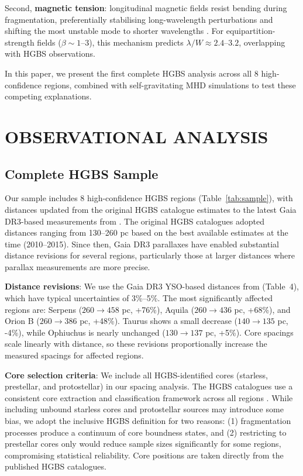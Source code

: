 \documentclass[twocolumn,longtitle,usenatbib]{mnras}
\begin{document}
Second, \textbf{magnetic tension}: longitudinal magnetic fields resist bending during fragmentation, preferentially stabilising long-wavelength perturbations and shifting the most unstable mode to shorter wavelengths \citep{Nakamura1993}. For equipartition-strength fields ($\beta \sim 1$--$3$), this mechanism predicts $\lambda/W \approx 2.4$--$3.2$, overlapping with HGBS observations.

In this paper, we present the first complete HGBS analysis across all 8 high-confidence regions, combined with self-gravitating MHD simulations to test these competing explanations.

\section{OBSERVATIONAL ANALYSIS}

\subsection{Complete HGBS Sample}

Our sample includes 8 high-confidence HGBS regions (Table~\ref{tab:sample}), with distances updated from the original HGBS catalogue estimates to the latest Gaia DR3-based measurements from \citet{Zhang2023}. The original HGBS catalogues \citep{Konyves2015, Konyves2020, Andre2016, Ladjelate2020} adopted distances ranging from 130--260 pc based on the best available estimates at the time (2010--2015). Since then, Gaia DR3 parallaxes have enabled substantial distance revisions for several regions, particularly those at larger distances where parallax measurements are more precise.

\textbf{Distance revisions}: We use the Gaia DR3 YSO-based distances from \citet{Zhang2023} (Table~4), which have typical uncertainties of 3\%--5\%. The most significantly affected regions are: Serpens ($260 \to 458$ pc, +76\%), Aquila ($260 \to 436$ pc, +68\%), and Orion B ($260 \to 386$ pc, +48\%). Taurus shows a small decrease ($140 \to 135$ pc, -4\%), while Ophiuchus is nearly unchanged ($130 \to 137$ pc, +5\%). Core spacings scale linearly with distance, so these revisions proportionally increase the measured spacings for affected regions.

\textbf{Core selection criteria}: We include all HGBS-identified cores (starless, prestellar, and protostellar) in our spacing analysis. The HGBS catalogues use a consistent core extraction and classification framework across all regions \citep{Konyves2015, Konyves2020}. While including unbound starless cores and protostellar sources may introduce some bias, we adopt the inclusive HGBS definition for two reasons: (1) fragmentation processes produce a continuum of core boundness states, and (2) restricting to prestellar cores only would reduce sample sizes significantly for some regions, compromising statistical reliability. Core positions are taken directly from the published HGBS catalogues.
\end{document}
